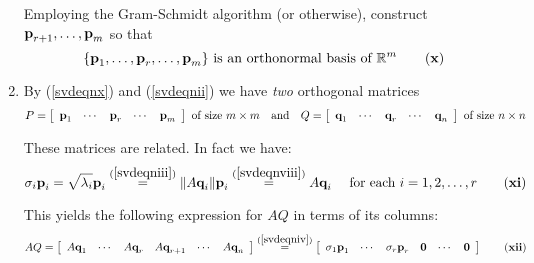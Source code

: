 \begin{enumerate}[label=\textbf{\arabic*.},leftmargin=*]
\noindent Employing the Gram-Schmidt algorithm (or otherwise), construct $\textbf{p}_{r+1},\ldots ,\textbf{p}_{m}$ so that
\begin{equation}\label{svdeqnx}
\{\vect{p}_{1},\ldots ,\vect{p}_{r},\ldots ,\vect{p}_{m}\} \mbox{ is an orthonormal basis of } \RR^{m} \tag{\textbf{x}}
\end{equation}

\item By (\ref{svdeqnx}) and (\ref{svdeqnii}) we have \emph{two}
orthogonal matrices
\begin{equation*}
P=\left[ \begin{array}{ccccc} \textbf{p}_{1} & \cdots & \textbf{p}_{r} & \cdots & \textbf{p}_{m} \end{array}\right] \mbox{ of size } m\times m \quad \mbox{and} \quad Q=\left[ \begin{array}{ccccc} \textbf{q}_{1} & \cdots & \textbf{q}_{r} & \cdots & \textbf{q}_{n}\end{array}\right] \mbox{ of size } n\times n
\end{equation*}

\noindent These matrices are related. In fact we have: 
\begin{equation}\label{svdeqnxi}
\sigma_{i}\vect{p}_{i}=\sqrt{\lambda_{i}} \vect{p}_{i}\overset{(\text{\ref{svdeqniii}})}{=}\vectlength A\vect{q}_{i}\vectlength \vect{p}_{i}\overset{(\text{\ref{svdeqnviii}})}{=}A\vect{q}_{i} \quad \mbox{ for each } i=1,2,\ldots ,r \tag{\textbf{xi}}
\end{equation}

\noindent This yields the following expression for $AQ$ in terms of its
columns:
\begin{equation}\label{svdeqnxii}
AQ=\leftB \begin{array}{cccccc} A\vect{q}_{1} & \cdots & A\vect{q}_{r} & A\vect{q}_{r+1} & \cdots & A\vect{q}_{n}\end{array}\rightB \overset{(\text{\ref{svdeqniv}})}{=}\leftB \begin{array}{cccccc}\sigma _{1} \vect{p}_{1} & \cdots & \sigma_{r}\vect{p}_{r}& \vect{0}& \cdots &\vect{0}\end{array}\rightB \tag{\textbf{xii}}
\end{equation}


\end{enumerate}
